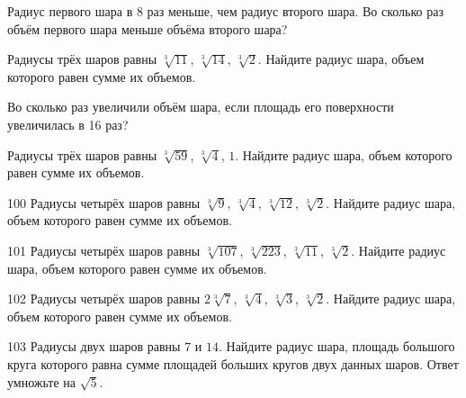 \documentclass[a4paper]{article}
\begin{document}
\begin{taskBN}{96}
Радиус первого шара в 8 раз меньше, чем радиус второго шара. Во сколько раз объём первого шара меньше объёма второго шара?
\end{taskBN}

\begin{taskBN}{97}
Радиусы трёх шаров равны $\sqrt[3]{11}$, $\sqrt[3]{14}$, $\sqrt[3]{2}$. Найдите радиус шара, объем которого равен сумме их объемов.
\end{taskBN}

\begin{taskBN}{98}
Во сколько раз увеличили объём шара, если площадь его поверхности увеличилась в 16 раз?
\end{taskBN}

\begin{taskBN}{99}
Радиусы трёх шаров равны $\sqrt[3]{59}$, $\sqrt[3]{4}$, $1$. Найдите радиус шара, объем которого равен сумме их объемов.
\end{taskBN}

\begin{taskBN}{100}
Радиусы четырёх шаров равны $\sqrt[3]{9}$, $\sqrt[3]{4}$, $\sqrt[3]{12}$, $\sqrt[3]{2}$. Найдите радиус шара, объем которого равен сумме их объемов.
\end{taskBN}

\begin{taskBN}{101}
Радиусы четырёх шаров равны $\sqrt[3]{107}$, $\sqrt[3]{223}$, $\sqrt[3]{11}$, $\sqrt[3]{2}$. Найдите радиус шара, объем которого равен сумме их объемов.
\end{taskBN}

\begin{taskBN}{102}
Радиусы четырёх шаров равны $2\sqrt[3]{7}$, $\sqrt[3]{4}$, $\sqrt[3]{3}$, $\sqrt[3]{2}$. Найдите радиус шара, объем которого равен сумме их объемов.
\end{taskBN}

\begin{taskBN}{103}
Радиусы двух шаров равны $7$ и $14$. Найдите радиус шара, площадь большого круга которого равна сумме площадей больших кругов двух данных шаров. Ответ умножьте на $\sqrt{5}$.
\end{taskBN}
\end{document}
